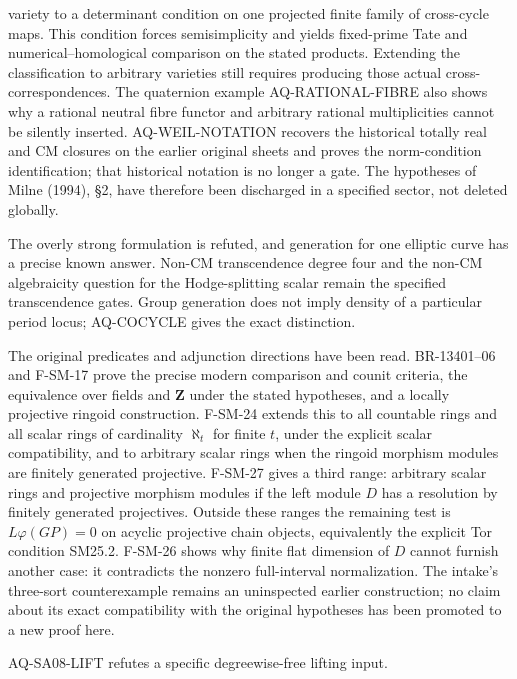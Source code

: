 \documentclass[11pt,a4paper]{article}
\theoremstyle{definition}\newtheorem{definition}[theorem]{Definition}
\theoremstyle{remark}\newtheorem{remark}[theorem]{Remark}
\begin{document}
\begin{description}[style=nextline,leftmargin=0pt,labelwidth=0pt,labelsep=0pt]
variety to a determinant condition on one projected finite family
of cross-cycle maps. This condition forces semisimplicity and yields
fixed-prime Tate and numerical--homological comparison on the stated
products. Extending the classification to arbitrary varieties still
requires producing those actual cross-correspondences. The
quaternion example AQ-RATIONAL-FIBRE also shows why a rational neutral
fibre functor and arbitrary rational multiplicities cannot be silently
inserted. AQ-WEIL-NOTATION recovers the historical totally real and CM
closures on the earlier original sheets and proves the norm-condition
identification; that historical notation is no longer a gate.
The hypotheses of Milne (1994), \S2, have therefore been
discharged in a specified sector, not deleted globally.
\item[Cote 18, scans 11--13 and 59: period density.]
The overly strong formulation is refuted, and generation for one
elliptic curve has a precise known answer. Non-CM transcendence degree
four and the non-CM algebraicity question for the Hodge-splitting
scalar remain the specified transcendence gates. Group generation
does not imply density of a particular period locus; AQ-COCYCLE
gives the exact distinction.
\item[Cote 134-8, scans 47--54: the linear theorem.]
The original predicates and adjunction directions have been read.
BR-13401--06 and F-SM-17 prove the precise modern comparison and
counit criteria, the equivalence over fields and \(\mathbf Z\) under
the stated hypotheses, and a locally projective ringoid construction.
F-SM-24 extends this to all countable rings and all scalar rings of
cardinality $\aleph_t$ for finite $t$, under the explicit scalar
compatibility, and to arbitrary scalar rings when the ringoid morphism
modules are finitely generated projective. F-SM-27 gives a third range:
arbitrary scalar rings and projective morphism modules if the left
module $D$ has a resolution by finitely generated projectives.
Outside these ranges the remaining test is
\(L\varphi(GP)=0\) on acyclic projective chain objects, equivalently
the explicit Tor condition SM25.2. F-SM-26 shows why finite flat
dimension of $D$ cannot furnish another case: it contradicts the
nonzero full-interval normalization. The intake's
three-sort counterexample remains an uninspected earlier construction;
no claim about its exact compatibility with the original hypotheses
has been promoted to a new proof here.
\item[SA08, cote 136/117--121: strict PD sources and localization.]
AQ-SA08-LIFT refutes a specific degreewise-free lifting input.

\end{description}
\end{document}
